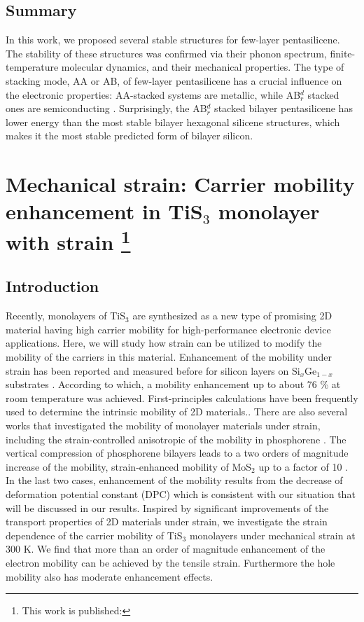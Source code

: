 \subsection{Summary}

In this work, we proposed several stable structures for few-layer pentasilicene. The stability of these structures was confirmed via their phonon spectrum, finite-temperature molecular dynamics, and their mechanical properties. The type of stacking mode, AA or AB, of few-layer pentasilicene has a crucial influence on the electronic properties: AA-stacked systems are metallic, while AB$_r^d$ stacked ones are semiconducting . Surprisingly, the AB$_r^d$ stacked bilayer pentasilicene has lower energy than the most stable bilayer hexagonal silicene structures, which makes it the most stable predicted form of bilayer silicon.  

\section[Mechanical strain: Carrier mobility enhancement in TiS$_3$ monolayer with strain]{Mechanical strain: Carrier mobility enhancement in TiS$_3$ monolayer with strain \footnote{This work is published:\cite{Aierken2016.mobility}} \label{mob_Tis3}}

\subsection{Introduction}

Recently, monolayers of TiS$_3$\cite{ADOM:ADOM201400043,ADMA:ADMA201405632} are synthesized as a new type of promising 2D material having high carrier mobility for high-performance electronic device applications. Here, we will study how strain can be utilized to modify the mobility of the carriers in this material. Enhancement of the mobility under strain has been reported and measured before for silicon layers on Si$_x$Ge$_{1-x}$ substrates \cite{Vogelsang1993,Welser1994}. According to which, a mobility enhancement up to about 76 \% at room temperature was achieved. First-principles calculations have been frequently used to determine the intrinsic mobility of 2D materials.\cite{Kaasbjerg2012,Zhang2014,Yongqing2014}. There are also several works that investigated the mobility of monolayer materials under strain\cite{fei,Henry2015,Sheng2015}, including the strain-controlled anisotropic of the mobility in phosphorene \cite{fei}. The vertical compression of phosphorene bilayers leads to a two orders of magnitude increase of the mobility\cite{Henry2015}, strain-enhanced mobility of MoS$_2$ up to a factor of 10 \cite{Sheng2015}. In the last two cases, enhancement of the mobility results from the decrease of deformation potential constant (DPC) which is consistent with our situation that will be discussed in our results. Inspired by significant improvements of the transport properties of 2D materials under strain, we investigate the strain dependence of the carrier mobility of TiS$_3$ monolayers under mechanical strain at 300 K. We find that more than an order of magnitude enhancement of the electron mobility can be achieved by the tensile strain. Furthermore the hole mobility also has moderate enhancement effects.


